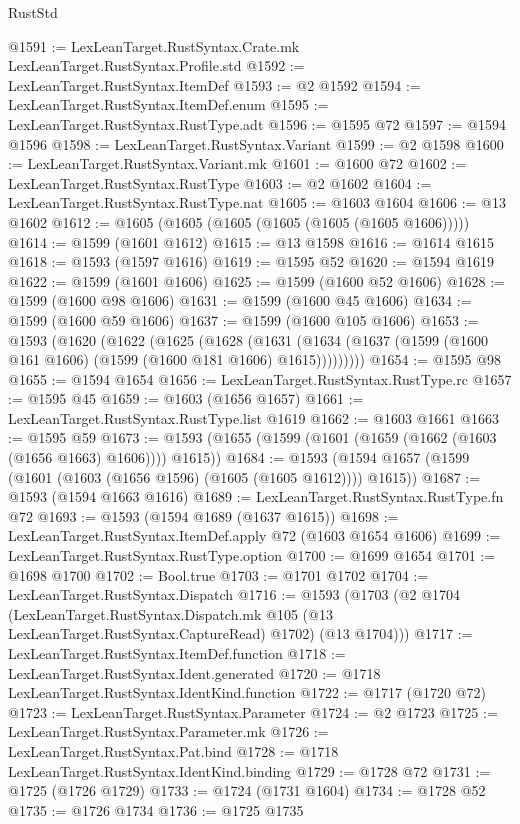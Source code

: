 \begin{lexlean}{RustStd}
\begin{coremodule}
@1591 := LexLeanTarget.RustSyntax.Crate.mk LexLeanTarget.RustSyntax.Profile.std
@1592 := LexLeanTarget.RustSyntax.ItemDef
@1593 := @2 @1592
@1594 := LexLeanTarget.RustSyntax.ItemDef.enum
@1595 := LexLeanTarget.RustSyntax.RustType.adt
@1596 := @1595 @72
@1597 := @1594 @1596
@1598 := LexLeanTarget.RustSyntax.Variant
@1599 := @2 @1598
@1600 := LexLeanTarget.RustSyntax.Variant.mk
@1601 := @1600 @72
@1602 := LexLeanTarget.RustSyntax.RustType
@1603 := @2 @1602
@1604 := LexLeanTarget.RustSyntax.RustType.nat
@1605 := @1603 @1604
@1606 := @13 @1602
@1612 := @1605 (@1605 (@1605 (@1605 (@1605 (@1605 @1606)))))
@1614 := @1599 (@1601 @1612)
@1615 := @13 @1598
@1616 := @1614 @1615
@1618 := @1593 (@1597 @1616)
@1619 := @1595 @52
@1620 := @1594 @1619
@1622 := @1599 (@1601 @1606)
@1625 := @1599 (@1600 @52 @1606)
@1628 := @1599 (@1600 @98 @1606)
@1631 := @1599 (@1600 @45 @1606)
@1634 := @1599 (@1600 @59 @1606)
@1637 := @1599 (@1600 @105 @1606)
@1653 := @1593
    (@1620
      (@1622
        (@1625
          (@1628
            (@1631 (@1634 (@1637 (@1599 (@1600 @161 @1606) (@1599 (@1600 @181 @1606) @1615)))))))))
@1654 := @1595 @98
@1655 := @1594 @1654
@1656 := LexLeanTarget.RustSyntax.RustType.rc
@1657 := @1595 @45
@1659 := @1603 (@1656 @1657)
@1661 := LexLeanTarget.RustSyntax.RustType.list @1619
@1662 := @1603 @1661
@1663 := @1595 @59
@1673 := @1593 (@1655 (@1599 (@1601 (@1659 (@1662 (@1603 (@1656 @1663) @1606)))) @1615))
@1684 := @1593 (@1594 @1657 (@1599 (@1601 (@1603 (@1656 @1596) (@1605 (@1605 @1612)))) @1615))
@1687 := @1593 (@1594 @1663 @1616)
@1689 := LexLeanTarget.RustSyntax.RustType.fn @72
@1693 := @1593 (@1594 @1689 (@1637 @1615))
@1698 := LexLeanTarget.RustSyntax.ItemDef.apply @72 (@1603 @1654 @1606)
@1699 := LexLeanTarget.RustSyntax.RustType.option
@1700 := @1699 @1654
@1701 := @1698 @1700
@1702 := Bool.true
@1703 := @1701 @1702
@1704 := LexLeanTarget.RustSyntax.Dispatch
@1716 := @1593
    (@1703
      (@2
        @1704
        (LexLeanTarget.RustSyntax.Dispatch.mk @105 (@13 LexLeanTarget.RustSyntax.CaptureRead) @1702)
        (@13 @1704)))
@1717 := LexLeanTarget.RustSyntax.ItemDef.function
@1718 := LexLeanTarget.RustSyntax.Ident.generated
@1720 := @1718 LexLeanTarget.RustSyntax.IdentKind.function
@1722 := @1717 (@1720 @72)
@1723 := LexLeanTarget.RustSyntax.Parameter
@1724 := @2 @1723
@1725 := LexLeanTarget.RustSyntax.Parameter.mk
@1726 := LexLeanTarget.RustSyntax.Pat.bind
@1728 := @1718 LexLeanTarget.RustSyntax.IdentKind.binding
@1729 := @1728 @72
@1731 := @1725 (@1726 @1729)
@1733 := @1724 (@1731 @1604)
@1734 := @1728 @52
@1735 := @1726 @1734
@1736 := @1725 @1735

\end{coremodule}
\end{lexlean}
